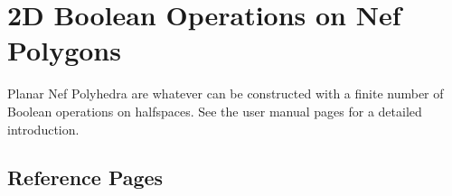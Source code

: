 

\chapter{2D Boolean Operations on Nef Polygons}
\label{chap:nef_2_ref}

Planar Nef Polyhedra are whatever can be constructed with a finite number of
Boolean operations on halfspaces. See the user manual pages for a detailed
introduction.

\section{Reference Pages}


 \\


 \\
 \\
 \\
 \\
 \\
 \\

